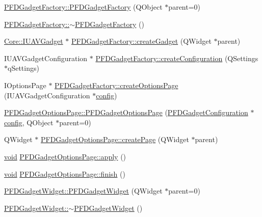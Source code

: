 \begin{DoxyCompactItemize}
\item 
\hyperlink{group___o_p_map_plugin_ga3c6dc1d198abb5039a6eae8378445ce8}{P\-F\-D\-Gadget\-Factory\-::\-P\-F\-D\-Gadget\-Factory} (Q\-Object $\ast$parent=0)
\item 
\hyperlink{group___o_p_map_plugin_ga56df1b4bb10efeda677e12cab72651a1}{P\-F\-D\-Gadget\-Factory\-::$\sim$\-P\-F\-D\-Gadget\-Factory} ()
\item 
\hyperlink{class_core_1_1_i_u_a_v_gadget}{Core\-::\-I\-U\-A\-V\-Gadget} $\ast$ \hyperlink{group___o_p_map_plugin_gaabdf0c7b16f184f5e8c2ca4dd1a8b6d0}{P\-F\-D\-Gadget\-Factory\-::create\-Gadget} (Q\-Widget $\ast$parent)
\item 
I\-U\-A\-V\-Gadget\-Configuration $\ast$ \hyperlink{group___o_p_map_plugin_gab815256ffa03ff2447c6be5a1d56e1ab}{P\-F\-D\-Gadget\-Factory\-::create\-Configuration} (Q\-Settings $\ast$q\-Settings)
\item 
I\-Options\-Page $\ast$ \hyperlink{group___o_p_map_plugin_ga74a3922aa2b3e3524dc1969c65f4bf07}{P\-F\-D\-Gadget\-Factory\-::create\-Options\-Page} (I\-U\-A\-V\-Gadget\-Configuration $\ast$\hyperlink{deflate_8c_a4473b5227787415097004fd39f55185e}{config})
\item 
\hyperlink{group___o_p_map_plugin_ga788662fb7f7fe425c74e222930c5234f}{P\-F\-D\-Gadget\-Options\-Page\-::\-P\-F\-D\-Gadget\-Options\-Page} (\hyperlink{class_p_f_d_gadget_configuration}{P\-F\-D\-Gadget\-Configuration} $\ast$\hyperlink{deflate_8c_a4473b5227787415097004fd39f55185e}{config}, Q\-Object $\ast$parent=0)
\item 
Q\-Widget $\ast$ \hyperlink{group___o_p_map_plugin_gafa8be3bab1132cd2079a9610e594aa77}{P\-F\-D\-Gadget\-Options\-Page\-::create\-Page} (Q\-Widget $\ast$parent)
\item 
\hyperlink{group___u_a_v_objects_plugin_ga444cf2ff3f0ecbe028adce838d373f5c}{void} \hyperlink{group___o_p_map_plugin_gafd1965bb221fe257dbf056b8441b15aa}{P\-F\-D\-Gadget\-Options\-Page\-::apply} ()
\item 
\hyperlink{group___u_a_v_objects_plugin_ga444cf2ff3f0ecbe028adce838d373f5c}{void} \hyperlink{group___o_p_map_plugin_ga1edd62ccbcef9e6090a5b9061c5af34f}{P\-F\-D\-Gadget\-Options\-Page\-::finish} ()
\item 
\hyperlink{group___o_p_map_plugin_ga17d40a36b34086eea9ceb1007e56ae57}{P\-F\-D\-Gadget\-Widget\-::\-P\-F\-D\-Gadget\-Widget} (Q\-Widget $\ast$parent=0)
\item 
\hyperlink{group___o_p_map_plugin_ga6e0515cffb2a380be1ecec650da18f4d}{P\-F\-D\-Gadget\-Widget\-::$\sim$\-P\-F\-D\-Gadget\-Widget} ()

\end{DoxyCompactItemize}
